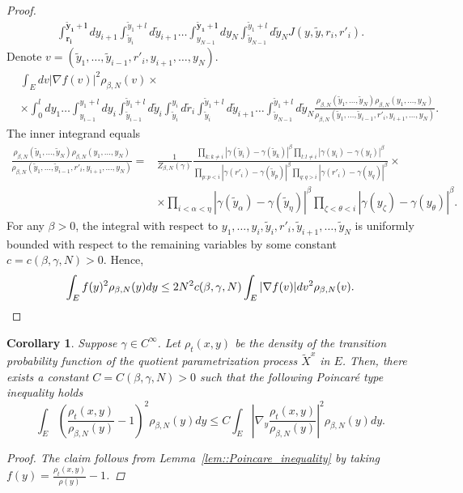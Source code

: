 \documentclass[11pt]{article}
\numberwithin{equation}{section}
\newtheorem{corollary}{Corollary}[theorem]
\theoremstyle{definition}
\begin{document}
\begin{proof}
\begin{align*}
    \int_{\boldsymbol{r_{i}}}^{\boldsymbol{\tilde y_{1}+l}}dy_{i+1}
    \int_{\tilde y_{i}}^{\tilde y_{1}+l}d\tilde y_{i+1}\dots
    \int_{y_{N-1}}^{\boldsymbol{\tilde y_{1}+l}}dy_{N}
    \int_{\tilde y_{N-1}}^{\tilde y_{1}+l}d\tilde y_{N}
    J(y,\tilde y, r_{i}, r'_{i}).
\end{align*}
Denote $v = (\tilde y_{1}, \dots, \tilde y_{i-1}, r'_{i}, y_{i+1},\dots, y_{N})$. 
\begin{align*}
    &\int_{E}dv |\nabla f(v)|^{2}\rho_{\beta,N}(v) \times\\
    &\times
    \int_{0}^{l}dy_{1}\dots  
    \int_{y_{i-1}}^{y_{1}+l}dy_{i}
    \int_{\tilde y_{i-1}}^{\tilde y_{1}+l}d\tilde y_{i}
    \int_{\tilde y_{i}}^{y_{i}}d\tilde r_{i}
    \int_{\tilde y_{i}}^{\tilde y_{1}+l}d\tilde y_{i+1}\dots
    \int_{\tilde y_{N-1}}^{\tilde y_{1}+l}d\tilde y_{N} 
    \frac{\rho_{\beta,N}(\tilde y_{1},\dots, \tilde y_{N})\rho_{\beta,N}(y_{1},\dots,y_{N})}{\rho_{\beta,N}(\tilde y_{1},\dots, \tilde y_{i-1}, r'_{i}, y_{i+1},\dots, y_{N})}.
\end{align*}
The inner integrand equals
\begin{align*}
    \frac{\rho_{\beta,N}(\tilde y_{1},\dots, \tilde y_{N})\rho_{\beta,N}(y_{1},\dots,y_{N})}{\rho_{\beta,N}(\tilde y_{1},\dots, \tilde y_{i-1}, r'_{i}, y_{i+1},\dots, y_{N})}
    = & \frac{1}{Z_{\beta,N}(\gamma)}\frac{\prod_{k: k \neq i}|\gamma(\tilde y_{i})-\gamma(\tilde y_{k})|^{\beta}\prod_{l: l \neq i}|\gamma( y_{i})-\gamma( y_{l})|^{\beta}}{\prod_{p:p < i} |\gamma( r'_{i})-\gamma(\tilde y_{p})|^{\beta}
    \prod_{q:q > i} |\gamma( r'_{i})-\gamma(y_{q})|^{\beta}} \times \\
    &\times\prod_{i<\alpha < \eta}|\gamma(\tilde y_{\alpha})-\gamma(\tilde y_{\eta})|^{\beta}
    \prod_{\zeta < \theta < i}|\gamma( y_{\zeta})-\gamma( y_{\theta})|^{\beta}.
\end{align*}
For any $\beta >0$, the integral with respect to $y_{1}, \dots, y_{i}, \tilde y_{i}, r'_{i}, \tilde y_{i+1}, \dots, \tilde y_{N}$ is uniformly bounded with respect to the remaining variables by some constant $c = c(\beta, \gamma, N)>0$. Hence, 
\[
     \int_{E}f(y)^{2}\rho_{\beta,N}(y)dy 
     \le 2N^{2} c(\beta, \gamma, N)
     \int_{E} |\nabla f(v)|dv^{2}\rho_{\beta,N}(v).\qedhere
\]
\end{proof}
\begin{corollary}
 Suppose $\gamma\in C^{\infty}$.  Let $\rho_{t}(x,y)$ be the density of the transition probability function of the quotient parametrization process $\tilde X^{x}$ in $E$. Then, there exists a constant $C = C(\beta,\gamma, N)>0$ such that the following Poincaré type inequality holds
    \[
    \int_{E}\left(\frac{\rho_{t}(x,y)}{\rho_{\beta,N}(y)}-1\right)^{2}\rho_{\beta,N}(y)dy  \le C\int_{E}\left|\nabla_{y} \frac{\rho_{t}(x,y)}{\rho_{\beta,N}(y)}\right|^{2}\rho_{\beta,N}(y)dy.
\]
\begin{proof}
    The claim follows from Lemma~\ref{lem::Poincare_inequality} by taking $f(y) = \frac{\rho_{t}(x,y)}{\rho(y)}-1$.
\end{proof}
\end{corollary}
\end{document}
